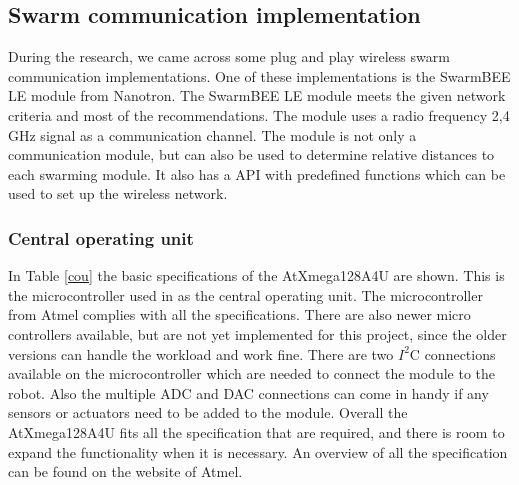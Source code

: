\documentclass[10pt,a4paper]{article}
\begin{document}


\subsection{Swarm communication implementation}
During the research, we came across some plug and play wireless swarm communication implementations. One of these implementations is the SwarmBEE LE module from Nanotron. The SwarmBEE LE module meets the given network criteria and most of the recommendations. The module uses a radio frequency 2,4 GHz signal as a communication channel. The module is not only a communication module, but can also be used to determine relative distances to each swarming module. It also has a API with predefined functions which can be used to set up the wireless network.

\subsubsection{Central operating unit}
In Table \ref{cou} the basic specifications of the AtXmega128A4U are shown. This is the microcontroller used in as the central operating unit. The microcontroller from Atmel complies with all the specifications. There are also newer micro controllers available, but are not yet implemented for this project, since the older versions can handle the workload and work fine. There are two $I^2$C connections available on the microcontroller which are needed to connect the module to the robot. Also the multiple ADC and DAC connections can come in handy if any sensors or actuators need to be added to the module. Overall the AtXmega128A4U fits all the specification that are required, and there is room to expand the functionality when it is necessary. An overview of all the specification can be found on the website of Atmel.
\end{document}
